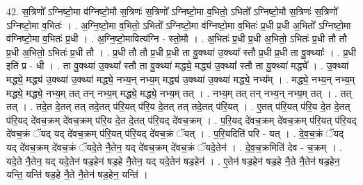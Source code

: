 \documentclass[17pt]{extarticle}
\begin{document}
42. स॒त्रिणो᳚ ऽग्निष्टो॒मा व॑ग्निष्टो॒मौ स॒त्रिणः॑ स॒त्रिणो᳚ ऽग्निष्टो॒मा व॒भितो॒ ऽभितो᳚ ऽग्निष्टो॒मौ स॒त्रिणः॑ स॒त्रिणो᳚ ऽग्निष्टो॒मा व॒भितः॑ । . अ॒ग्नि॒ष्टो॒मा व॒भितो॒ ऽभितो᳚ ऽग्निष्टो॒मा व॑ग्निष्टो॒मा व॒भितः॑ प्र॒धी प्र॒धी अ॒भितो᳚ ऽग्निष्टो॒मा व॑ग्निष्टो॒मा व॒भितः॑ प्र॒धी । . अ॒ग्नि॒ष्टो॒मावित्य॑ग्नि - स्तो॒मौ । . अ॒भितः॑ प्र॒धी प्र॒धी अ॒भितो॒ ऽभितः॑ प्र॒धी तौ तौ प्र॒धी अ॒भितो॒ ऽभितः॑ प्र॒धी तौ । . प्र॒धी तौ तौ प्र॒धी प्र॒धी ता वु॒क्थ्या॑ उ॒क्थ्या᳚ स्तौ प्र॒धी प्र॒धी ता वु॒क्थ्याः᳚ । . प्र॒धी इति॑ प्र - धी । . ता वु॒क्थ्या॑ उ॒क्थ्या᳚ स्तौ ता वु॒क्थ्या॑ मद्ध्ये॒ मद्ध्य॑ उ॒क्थ्या᳚ स्तौ ता वु॒क्थ्या॑ मद्ध्ये᳚ । . उ॒क्थ्या॑ मद्ध्ये॒ मद्ध्य॑ उ॒क्थ्या॑ उ॒क्थ्या॑ मद्ध्ये॒ नभ्य॒न् नभ्य॒म् मद्ध्य॑ उ॒क्थ्या॑ उ॒क्थ्या॑ मद्ध्ये॒ नभ्य᳚म् । . मद्ध्ये॒ नभ्य॒न् नभ्य॒म् मद्ध्ये॒ मद्ध्ये॒ नभ्य॒म् तत् तन् नभ्य॒म् मद्ध्ये॒ मद्ध्ये॒ नभ्य॒म् तत् । . नभ्य॒म् तत् तन् नभ्य॒न् नभ्य॒म् तत् । . तत् तत् । . तदे॒त दे॒तत् तत् तदे॒तत् प॑रि॒यत् प॑रि॒य दे॒तत् तत् तदे॒तत् प॑रि॒यत् । . ए॒तत् प॑रि॒यत् प॑रि॒य दे॒त दे॒तत् प॑रि॒यद् दे॑वच॒क्रम् दे॑वच॒क्रम् प॑रि॒य दे॒त दे॒तत् प॑रि॒यद् दे॑वच॒क्रम् । . प॒रि॒यद् दे॑वच॒क्रम् दे॑वच॒क्रम् प॑रि॒यत् प॑रि॒यद् दे॑वच॒क्रं ॅयद् यद् दे॑वच॒क्रम् प॑रि॒यत् प॑रि॒यद् दे॑वच॒क्रं ॅयत् । . प॒रि॒यदिति॑ परि - यत् । . दे॒व॒च॒क्रं ॅयद् यद् दे॑वच॒क्रम् दे॑वच॒क्रं ॅयदे॒ते नै॒तेन॒ यद् दे॑वच॒क्रम् दे॑वच॒क्रं ॅयदे॒तेन॑ । . दे॒व॒च॒क्रमिति॑ देव - च॒क्रम् । . यदे॒ते नै॒तेन॒ यद् यदे॒तेन॑ षड॒हेन॑ षड॒हे नै॒तेन॒ यद् यदे॒तेन॑ षड॒हेन॑ । . ए॒तेन॑ षड॒हेन॑ षड॒हे नै॒ते नै॒तेन॑ षड॒हेन॒ यन्ति॒ यन्ति॑ षड॒हे नै॒ते नै॒तेन॑ षड॒हेन॒ यन्ति॑ । \newline
\pagebreak
{}
\end{document}

